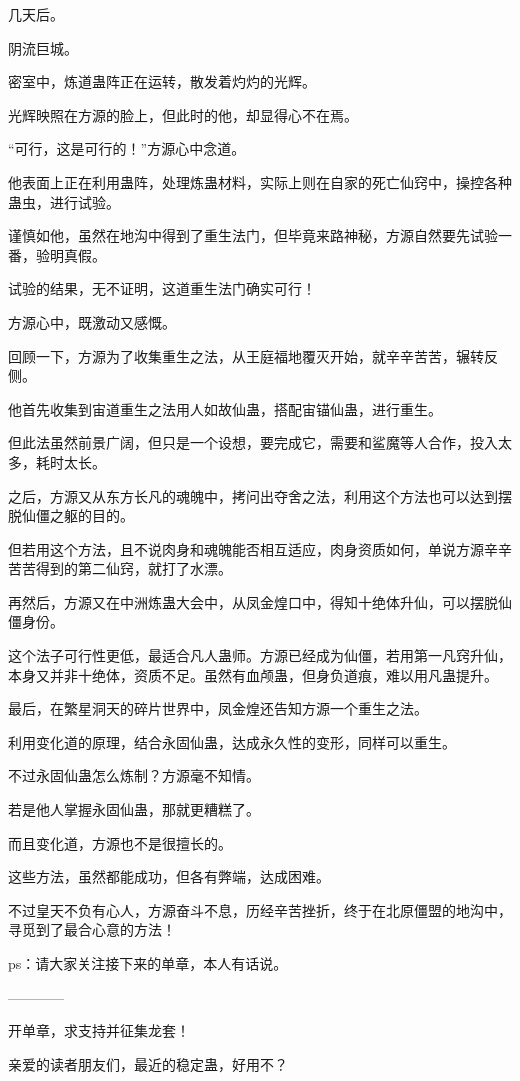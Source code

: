 \begin{this_body}
几天后。

阴流巨城。

密室中，炼道蛊阵正在运转，散发着灼灼的光辉。

光辉映照在方源的脸上，但此时的他，却显得心不在焉。

“可行，这是可行的！”方源心中念道。

他表面上正在利用蛊阵，处理炼蛊材料，实际上则在自家的死亡仙窍中，操控各种蛊虫，进行试验。

谨慎如他，虽然在地沟中得到了重生法门，但毕竟来路神秘，方源自然要先试验一番，验明真假。

试验的结果，无不证明，这道重生法门确实可行！

方源心中，既激动又感慨。

回顾一下，方源为了收集重生之法，从王庭福地覆灭开始，就辛辛苦苦，辗转反侧。

他首先收集到宙道重生之法用人如故仙蛊，搭配宙锚仙蛊，进行重生。

但此法虽然前景广阔，但只是一个设想，要完成它，需要和鲨魔等人合作，投入太多，耗时太长。

之后，方源又从东方长凡的魂魄中，拷问出夺舍之法，利用这个方法也可以达到摆脱仙僵之躯的目的。

但若用这个方法，且不说肉身和魂魄能否相互适应，肉身资质如何，单说方源辛辛苦苦得到的第二仙窍，就打了水漂。

再然后，方源又在中洲炼蛊大会中，从凤金煌口中，得知十绝体升仙，可以摆脱仙僵身份。

这个法子可行性更低，最适合凡人蛊师。方源已经成为仙僵，若用第一凡窍升仙，本身又并非十绝体，资质不足。虽然有血颅蛊，但身负道痕，难以用凡蛊提升。

最后，在繁星洞天的碎片世界中，凤金煌还告知方源一个重生之法。

利用变化道的原理，结合永固仙蛊，达成永久性的变形，同样可以重生。

不过永固仙蛊怎么炼制？方源毫不知情。

若是他人掌握永固仙蛊，那就更糟糕了。

而且变化道，方源也不是很擅长的。

这些方法，虽然都能成功，但各有弊端，达成困难。

不过皇天不负有心人，方源奋斗不息，历经辛苦挫折，终于在北原僵盟的地沟中，寻觅到了最合心意的方法！

ps：请大家关注接下来的单章，本人有话说。

------------

开单章，求支持并征集龙套！

亲爱的读者朋友们，最近的稳定蛊，好用不？


\end{this_body}
